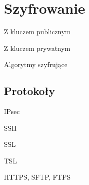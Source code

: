 \section{Szyfrowanie}

\begin{frame}{Z kluczem publicznym}

\end{frame}

\begin{frame}{Z kluczem prywatnym}
	
\end{frame}

\begin{frame}{Algorytmy szyfrujące}
	
\end{frame}

\subsection{Protokoły}

\begin{frame}{IPsec}
	
\end{frame}

\begin{frame}{SSH}
	
\end{frame}

\begin{frame}{SSL}
	
\end{frame}

\begin{frame}{TSL}
	
\end{frame}

\begin{frame}{HTTPS, SFTP, FTPS}
	
\end{frame}

